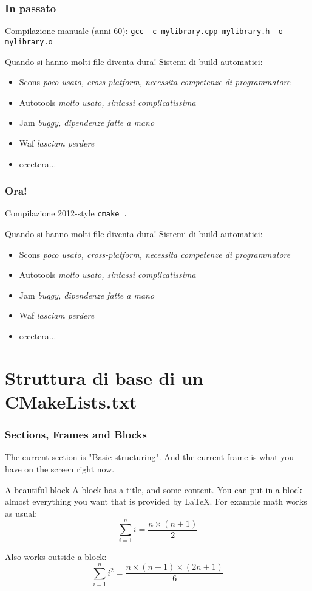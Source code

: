 \documentclass[12pt]{beamer}
\begin{document}
\begin{frame}
  \frametitle{In passato}
  Compilazione manuale (anni 60):
  \texttt{gcc -c mylibrary.cpp mylibrary.h -o mylibrary.o}
  
  Quando si hanno molti file diventa dura! Sistemi di build automatici:
  \begin{itemize}
  \item Scons \textit{poco usato, cross-platform, necessita competenze di programmatore}
  \item Autotools \textit{ molto usato, sintassi complicatissima }
  \item Jam \textit{ buggy, dipendenze fatte a mano}
  \item Waf \textit{lasciam perdere}
  \item eccetera...
  \end{itemize}
\end{frame}

\begin{frame}
  \frametitle{Ora!}
  Compilazione 2012-style
  \texttt{cmake .}
  
  Quando si hanno molti file diventa dura! Sistemi di build automatici:
  \begin{itemize}
  \item Scons \textit{poco usato, cross-platform, necessita competenze di programmatore}
  \item Autotools \textit{ molto usato, sintassi complicatissima }
  \item Jam \textit{ buggy, dipendenze fatte a mano}
  \item Waf \textit{lasciam perdere}
  \item eccetera...
  \end{itemize}
\end{frame}

\section{Struttura di base di un CMakeLists.txt}
\begin{frame}
  \frametitle{Sections, Frames and Blocks}
  
  The current section is "Basic structuring". And the current frame
  is what you have on the screen right now.

  \begin{block}{A beautiful block}
  A block has a title, and some content. You can put in a block
  almost everything you want that is provided by LaTeX. For example
  math works as usual:
    \begin{equation}
    \sum_{i=1}^n i = \frac{n \times (n+1)}{2}
    \end{equation}
  \end{block}

  Also works outside a block:
  \begin{equation}
  \sum_{i=1}^n i^2 = \frac{n \times (n+1) \times (2n+1)}{6}
  \end{equation}
\end{frame}
\end{document}
